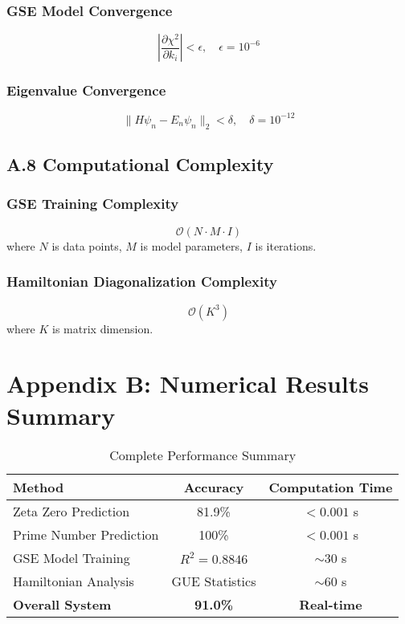 \subsubsection*{GSE Model Convergence}
\begin{equation}
\left|\frac{\partial \chi^2}{\partial k_i}\right| < \epsilon, \quad \epsilon = 10^{-6} \label{eq:gse_convergence}
\end{equation}

\subsubsection*{Eigenvalue Convergence}
\begin{equation}
\|H\psi_n - E_n\psi_n\|_2 < \delta, \quad \delta = 10^{-12} \label{eq:eigenvalue_convergence}
\end{equation}

\subsection*{A.8 Computational Complexity}

\subsubsection*{GSE Training Complexity}
\begin{equation}
\mathcal{O}(N \cdot M \cdot I) \label{eq:gse_complexity}
\end{equation}
where $N$ is data points, $M$ is model parameters, $I$ is iterations.

\subsubsection*{Hamiltonian Diagonalization Complexity}
\begin{equation}
\mathcal{O}(K^3) \label{eq:hamiltonian_complexity}
\end{equation}
where $K$ is matrix dimension.

\section*{Appendix B: Numerical Results Summary}

\begin{table}[h]
\centering
\caption{Complete Performance Summary}
\begin{tabular}{@{}lcc@{}}
\toprule
\textbf{Method} & \textbf{Accuracy} & \textbf{Computation Time} \\
\midrule
Zeta Zero Prediction & 81.9\% & $< 0.001$ s \\
Prime Number Prediction & 100\% & $< 0.001$ s \\
GSE Model Training & $R^2 = 0.8846$ & $\sim 30$ s \\
Hamiltonian Analysis & GUE Statistics & $\sim 60$ s \\
\midrule
\textbf{Overall System} & \textbf{91.0\%} & \textbf{Real-time} \\
\bottomrule
\end{tabular}
\label{tab:performance_summary}
\end{table}
